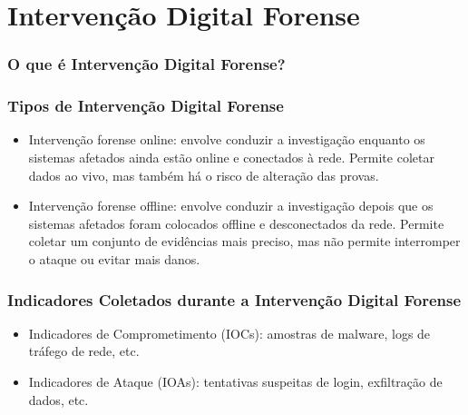 \section{Intervenção Digital Forense}
\begin{frame}
  \frametitle{O que é Intervenção Digital Forense?}
\end{frame}

\begin{frame}
  \frametitle{Tipos de Intervenção Digital Forense}
  \begin{itemize}
    \item Intervenção forense online: envolve conduzir a investigação enquanto os sistemas afetados ainda estão online e conectados à rede. Permite coletar dados ao vivo, mas também há o risco de alteração das provas.
    \item Intervenção forense offline: envolve conduzir a investigação depois que os sistemas afetados foram colocados offline e desconectados da rede. Permite coletar um conjunto de evidências mais preciso, mas não permite interromper o ataque ou evitar mais danos.
  \end{itemize}
\end{frame}

\begin{frame}
  \frametitle{Indicadores Coletados durante a Intervenção Digital Forense}
  \begin{itemize}
    \item Indicadores de Comprometimento (IOCs): amostras de malware, logs de tráfego de rede, etc.
    \item Indicadores de Ataque (IOAs): tentativas suspeitas de login, exfiltração de dados, etc.
  \end{itemize}
\end{frame}
